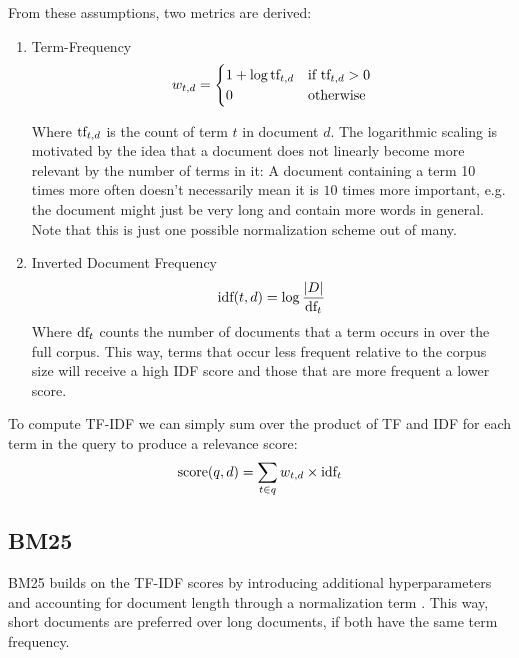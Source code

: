 From these assumptions, two metrics are derived:
\begin{enumerate}
    \item Term-Frequency
          \begin{equation}
              w_{t,d} = \begin{cases}
                  1 + \log \text{tf}_{t, d} & \text{if } \text{tf}_{t, d} > 0 \\
                  0                       & \text{otherwise}              \\
              \end{cases}
          \end{equation}

          Where $\text{tf}_{t, d}$ is the count of term $t$ in document $d$. The logarithmic scaling is motivated by the idea that a document does not linearly become more relevant by the number of terms in it: A document containing a term 10 times more often doesn't necessarily mean it is $10$ times more important, e.g. the document might just be very long and contain more words in general. Note that this is just one possible normalization scheme out of many.

    \item Inverted Document Frequency
          \begin{equation}
              \text{idf}(t, d) = \log \frac{|D|}{\text{df}_t}
          \end{equation}
          Where $\text{df}_t$ counts the number of documents that a term occurs in over the full corpus. This way, terms that occur less frequent relative to the corpus size will receive a high IDF score and those that are more frequent a lower score.

\end{enumerate}

\begin{table}

\end{table}
To compute TF-IDF we can simply sum over the product of TF and IDF for each term in the query to produce a relevance score:
\begin{equation}
    \text{score}(q, d) = \sum_{t \in q} w_{t,d} \times \text{idf}_t
\end{equation}

\subsection{BM25}
\label{sec:bm25}
BM25 builds on the TF-IDF scores  by introducing additional hyperparameters and accounting for document length through a normalization term \cite{robertson2009probabilistic}. This way, short documents are preferred over long documents, if both have the same term frequency.

